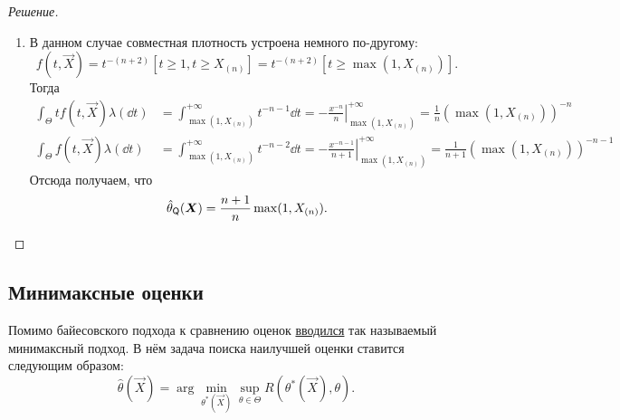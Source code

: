 \begin{proof}[Решение]
\begin{enumerate}[label=(\alph*)]
        \item В данном случае совместная плотность устроена немного по-другому:
        \[
            f(t, \vec{X}) = t^{-(n + 2)}[t \geq 1, t \geq X_{(n)}] = t^{-(n + 2)}[t \geq \max(1, X_{(n)})].
        \]
        Тогда
        \begin{align*}
            \int_{\Theta} tf(t, \vec{X})\lambda(\dd t)
            &= \int_{\max(1, X_{(n)})}^{+\infty} t^{-n - 1}\dd t
            = \left.-\frac{x^{-n}}{n}\right|_{\max(1, X_{(n)})}^{+\infty}
            = \frac{1}{n}(\max(1, X_{(n)}))^{-n} \\
            \int_{\Theta} f(t, \vec{X})\lambda(\dd t)
            &= \int_{\max(1, X_{(n)})}^{+\infty} t^{-n - 2}\dd t
            = \left.-\frac{x^{-n - 1}}{n + 1}\right|_{\max(1, X_{(n)})}^{+\infty}
            = \frac{1}{n + 1}(\max(1, X_{(n)}))^{-n - 1} 
        \end{align*}
        Отсюда получаем, что
        \[
            \hat{\theta}_{\mathsf{Q}}(\bm{X}) = \frac{n + 1}{n}\max(1, X_{(n)}). \qedhere
        \]
    \end{enumerate}
\end{proof}

\subsection{Минимаксные оценки}
Помимо байесовского подхода к сравнению оценок \hyperref[lec2:minimax]{вводился} так называемый минимаксный подход. В нём задача поиска наилучшей оценки ставится следующим образом:
\[
    \hat{\theta}(\vec{X}) = \arg\min_{\theta^{*}(\vec{X})}\sup_{\theta \in \Theta} R(\theta^{*}(\vec{X}), \theta).
\]

